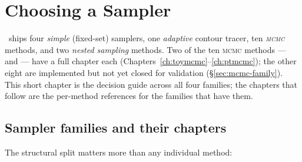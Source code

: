 \chapter{Choosing a Sampler}
\label{ch:choosing-sampler}

 \Jtwo\ ships four
\emph{simple} (fixed-set) samplers, one \emph{adaptive} contour tracer, ten
\emph{\textsc{mcmc}} methods, and two \emph{nested sampling} methods. Two of the ten
\textsc{mcmc} methods ---  and  --- have a full
chapter each (Chapters~\ref{ch:toymcmc}--\ref{ch:ptmcmc}); the other eight are
implemented but not yet closed for validation (\S\ref{sec:mcmc-family}). This short
chapter is the decision guide across all four families; the chapters that follow are
the per-method references for the families that have them.

\section{Sampler families and their chapters}
\label{sec:sampler-chapter-index}
\label{sec:fixed-vs-feedback}

The structural split matters more than any individual method:

